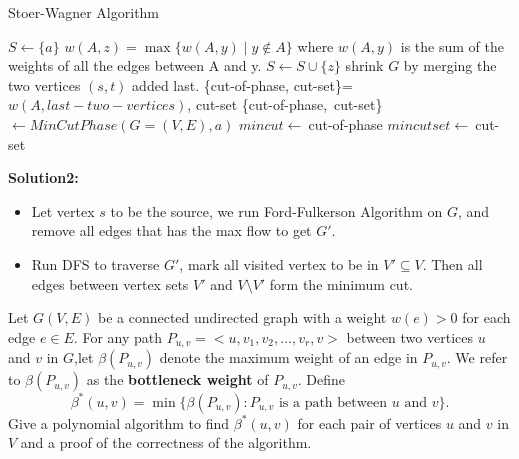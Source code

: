 \documentclass{article}
\newcounter{exercise}
\newcommand{\<}{
    \langle}
\renewcommand{\>}{
    \rangle}
\begin{document}
{\begin{itemize}
    \end{itemize}
\begin{algorithm}[htb]
    \caption{Stoer-Wagner Algorithm}
    \begin{algorithmic}[1]
            \State $S \leftarrow \{a\}$
                \State  $w(A,z)=\max\{w(A,y)\mid y\notin A\}$
                \State where $w(A,y)$ is the sum of the weights of all the edges between A and y.
                \State $S\leftarrow S\cup \{z\}$
                \State shrink $G$ by merging the two vertices $(s, t)$ added last.
                \State
                \Return \{cut-of-phase, cut-set\}=$w(A, last-two-vertices)$, cut-set
            \EndWhile      
        \EndProcedure
        \State
                \State \{cut-of-phase,\ cut-set\}$\leftarrow MinCutPhase(G=(V,E),a)$
                \State
                    \State $mincut \leftarrow\ $cut-of-phase
                    \State $mincutset \leftarrow\ $cut-set
                \EndIf
            \EndWhile
        \EndProcedure
    \end{algorithmic}
\end{algorithm}

\textbf{Solution2:}
\begin{itemize}
    \item Let vertex $s$ to be the source, we run Ford-Fulkerson Algorithm on $G$, and remove all edges that has the max flow to get $G'$.
    \item Run DFS to traverse $G'$, mark all visited vertex to be in $V' \subseteq V$. Then all edges between vertex sets $V'$ and $V\setminus V'$ form the minimum cut.
\end{itemize}
\newpage

\begin{exercise}
Let $G(V,E)$ be a connected undirected graph with a weight $w(e)>0$ for each edge $e\in E$. For any path $P_{u,v}=<u,v_1,v_2,\ldots,v_r,v>$ between two vertices $u$ and $v$ in $G$,let $\beta(P_{u,v})$ denote the maximum weight of an edge in $P_{u,v}$. We refer to $\beta(P_{u,v})$ as the \textbf{bottleneck weight} of $P_{u,v}$. Define
\begin{displaymath}
\beta^*(u,v)=\min\{\beta(P_{u,v}):P_{u,v}\text{ is a path between $u$ and $v$}\}.
\end{displaymath}
Give a polynomial algorithm to find $\beta^*(u,v)$ for each pair of vertices $u$ and $v$ in $V$ and a proof of the correctness of the algorithm.
\end{exercise}

}
\end{document}

